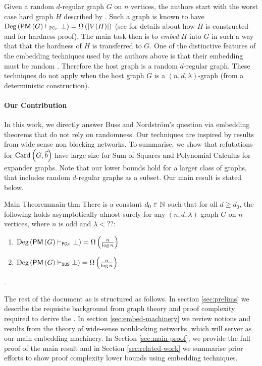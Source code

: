 \documentclass[11pt]{article}
\newcommand{\Degree}[1]{\text{Deg}\left(#1\right)}
\newcommand{\PerfectMatching}[1]{\mathsf{PM}\left(#1\right)}
\newcommand{\PC}{\vdash_{\texttt{PC}_F}}
\newcommand{\SOS}{\vdash_{\texttt{SOS}}}
\newcommand{\EnDeeLambda}{(n, d, \lambda)}
\begin{document}
Given a random $d$-regular graph $G$ on $n$ vertices, the authors start with the worst case hard graph $H$ described by \citet{buss1999linear}.
Such a graph is known to have $\Degree{\PerfectMatching{G} \PC \bot} = \BigOmega{\Size{V(H)}}$ (see \citep[Appendix A]{Austrin_2022} for details about how $H$ is constructed and \citet{buss1999linear} for hardness proof).
The main task then is to \emph{embed} $H$ into $G$ in such a way that that the hardness of $H$ is transferred to $G$.
One of the distinctive features of the embedding techniques used by the authors above is that their embedding must be random \citep[See Section 6]{Austrin_2022}.
Therefore the host graph is a random $d$-regular graph.
These techniques do not apply when the host graph $G$ is a $\EnDeeLambda$-graph (from a deterministic construction).

\paragraph{Our Contribution} In this work, we directly answer Buss and Nordstr{\"o}m's question via embedding theorems that do not rely on randomness.
Our techniques are inspired by results from wide sense non blocking networks. 
To summarise, we show that refutations for $\text{Card}\left(G, \vec{b}\right)$ have large size for Sum-of-Squares and Polynomial Calculus for expander graphs.
Note that our lower bounds hold for a larger class of graphs, that includes random $d$-regular graphs as a subset.
Our main result is stated below.

\begin{theorem}{Main Theorem}{main-thm}
There is a constant $d_0 \in \mathbb{N}$ such that for all $d \geq d_0$, the following holds asymptotically almost surely for any $(n, d, \lambda)$-graph $G$ on $n$ vertices, where $n$ is odd and $\lambda < ??$:
\begin{enumerate}
    \item{ $\Degree{\PerfectMatching{G} \PC \bot} = \BigOmega{\frac{n}{\log n}}$} 
    \item{$\Degree{\PerfectMatching{G} \SOS \bot} = \BigOmega{\frac{n}{\log n}}$}
\end{enumerate}

.

\end{theorem}

The rest of the document as is structured as follows. In section \ref{sec:prelims} we describe the requisite background from graph theory and proof complexity required to derive the .
In section \ref{sec:embed-machinery} we review notions and results from the theory of wide-sense nonblocking networks, which will server as our main embedding machinery.
In Section \ref{sec:main-proof}, we provide the full proof of the main result and in Section \ref{sec:related-work} we summarise prior efforts to show proof complexity lower bounds using embedding techniques.
\end{document}
